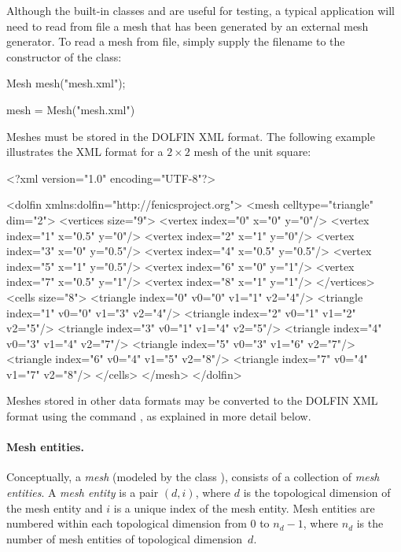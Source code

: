 Although the built-in classes  and 
are useful for testing, a typical application will need to read from
file a mesh that has been generated by an external mesh generator. To read
a mesh from file, simply supply the filename to the constructor of the
 class:
\begin{c++}
Mesh mesh("mesh.xml");
\end{c++}
\begin{python}
mesh = Mesh("mesh.xml")
\end{python}
Meshes must be stored in the DOLFIN XML format. The following example
illustrates the XML format for a $2 \times 2$ mesh of the unit square:


\begin{xml}
<?xml version="1.0" encoding="UTF-8"?>

<dolfin xmlns:dolfin="http://fenicsproject.org">
  <mesh celltype="triangle" dim="2">
    <vertices size="9">
      <vertex index="0" x="0" y="0"/>
      <vertex index="1" x="0.5" y="0"/>
      <vertex index="2" x="1" y="0"/>
      <vertex index="3" x="0" y="0.5"/>
      <vertex index="4" x="0.5" y="0.5"/>
      <vertex index="5" x="1" y="0.5"/>
      <vertex index="6" x="0" y="1"/>
      <vertex index="7" x="0.5" y="1"/>
      <vertex index="8" x="1" y="1"/>
    </vertices>
    <cells size="8">
      <triangle index="0" v0="0" v1="1" v2="4"/>
      <triangle index="1" v0="0" v1="3" v2="4"/>
      <triangle index="2" v0="1" v1="2" v2="5"/>
      <triangle index="3" v0="1" v1="4" v2="5"/>
      <triangle index="4" v0="3" v1="4" v2="7"/>
      <triangle index="5" v0="3" v1="6" v2="7"/>
      <triangle index="6" v0="4" v1="5" v2="8"/>
      <triangle index="7" v0="4" v1="7" v2="8"/>
    </cells>
  </mesh>
</dolfin>
\end{xml}
Meshes stored in other data formats may be converted to the DOLFIN XML
format using the command , as explained in more
detail below.

\paragraph{Mesh entities.}

Conceptually, a \emph{mesh} (modeled by the class ), consists of
a collection of \emph{mesh entities}.  A \emph{mesh entity} is a pair $(d,
i)$, where $d$ is the topological dimension of the mesh entity and $i$
is a unique index of the mesh entity. Mesh entities are numbered within
each topological dimension from $0$ to $n_d-1$, where $n_d$ is the number
of mesh entities of topological dimension~$d$.

